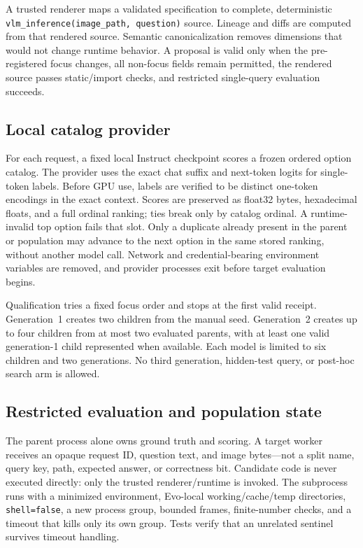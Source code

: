 \documentclass{article}
\begin{document}
A trusted renderer maps a validated specification to complete, deterministic
\texttt{vlm\_inference(image\_path, question)} source. Lineage and diffs are
computed from that rendered source. Semantic canonicalization removes dimensions
that would not change runtime behavior. A proposal is valid only when the
pre-registered focus changes, all non-focus fields remain permitted, the rendered
source passes static/import checks, and restricted single-query evaluation
succeeds.

\subsection{Local catalog provider}
For each request, a fixed local Instruct checkpoint scores a frozen ordered option
catalog. The provider uses the exact chat suffix and next-token logits for
single-token labels. Before GPU use, labels are verified to be distinct one-token
encodings in the exact context. Scores are preserved as float32 bytes, hexadecimal
floats, and a full ordinal ranking; ties break only by catalog ordinal. A runtime-
invalid top option fails that slot. Only a duplicate already present in the parent
or population may advance to the next option in the same stored ranking, without
another model call. Network and credential-bearing environment variables are
removed, and provider processes exit before target evaluation begins.

Qualification tries a fixed focus order and stops at the first valid receipt.
Generation~1 creates two children from the manual seed. Generation~2 creates up
to four children from at most two evaluated parents, with at least one valid
generation-1 child represented when available. Each model is limited to six
children and two generations. No third generation, hidden-test query, or
post-hoc search arm is allowed.

\subsection{Restricted evaluation and population state}
The parent process alone owns ground truth and scoring. A target worker receives
an opaque request ID, question text, and image bytes---not a split name, query key,
path, expected answer, or correctness bit. Candidate code is never executed
directly: only the trusted renderer/runtime is invoked. The subprocess runs with
a minimized environment, Evo-local working/cache/temp directories,
\texttt{shell=false}, a new process group, bounded frames, finite-number checks,
and a timeout that kills only its own group. Tests verify that an unrelated
sentinel survives timeout handling.
\end{document}
